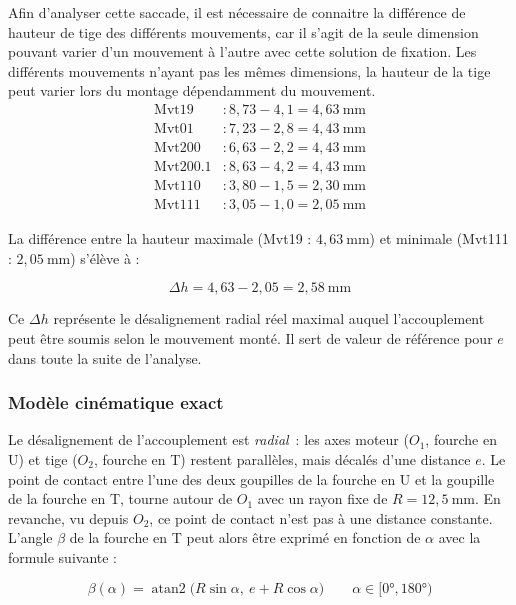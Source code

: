 Afin d'analyser cette saccade, il est nécessaire de connaitre la différence de hauteur de tige des différents mouvements, car il s'agit de la seule dimension pouvant varier d'un mouvement à l'autre avec cette solution de fixation. 
Les différents mouvements n'ayant pas les mêmes dimensions, la hauteur de la tige peut varier lors du montage dépendamment du mouvement.
\begin{align*}
  \text{Mvt19} &: 8{,}73 - 4{,}1 = 4{,}63\ \text{mm} \\
  \text{Mvt01} &: 7{,}23 - 2{,}8 = 4{,}43\ \text{mm} \\
  \text{Mvt200} &: 6{,}63 - 2{,}2 = 4{,}43\ \text{mm} \\
  \text{Mvt200.1} &: 8{,}63 - 4{,}2 = 4{,}43\ \text{mm} \\
  \text{Mvt110} &: 3{,}80 - 1{,}5 = 2{,}30\ \text{mm} \\
  \text{Mvt111} &: 3{,}05 - 1{,}0 = 2{,}05\ \text{mm}
\end{align*}

La différence entre la hauteur maximale (Mvt19 : $4{,}63\ \text{mm}$) et minimale (Mvt111 : $2{,}05\ \text{mm}$) s'élève à :

\begin{equation}
  \Delta h = 4{,}63 - 2{,}05 = 2{,}58\ \text{mm}
  \label{eq:delta_h}
\end{equation}

Ce $\Delta h$ représente le désalignement radial réel maximal auquel
l'accouplement peut être soumis selon le mouvement monté. Il sert de valeur
de référence pour $e$ dans toute la suite de l'analyse.

\subsubsection{Modèle cinématique exact}

Le désalignement de l'accouplement est \emph{radial}~: les axes moteur
($O_1$, fourche en U) et tige ($O_2$, fourche en T) restent parallèles, mais
décalés d'une distance $e$. Le point de contact entre l'une des deux goupilles de la fourche en U et la goupille de la fourche en T,
tourne autour de $O_1$ avec un rayon fixe de $R = 12{,}5\ \text{mm}$. En revanche, vu depuis $O_2$, ce point de contact n'est pas à une distance constante.
L'angle $\beta$ de la fourche en T peut alors être exprimé en fonction de $\alpha$ avec la formule suivante :

\begin{equation}
  \beta(\alpha) = \operatorname{atan2}\!\big(R\sin\alpha,\ e+R\cos\alpha\big)
  \qquad \alpha\in[0°,180°)
  \label{eq:beta_alpha}
\end{equation}


